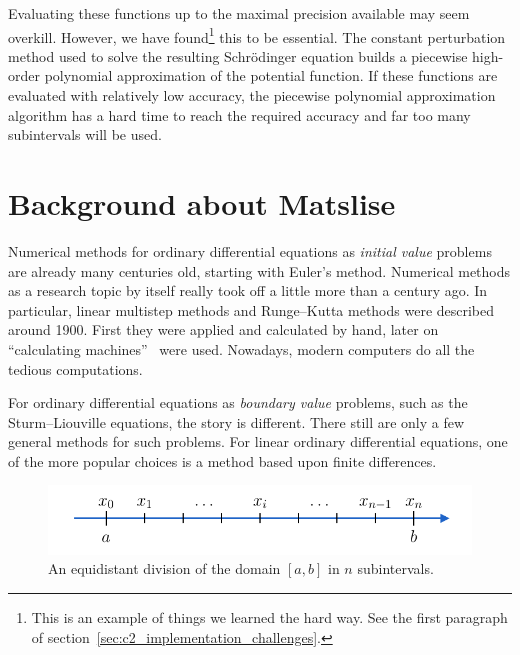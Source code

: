 Evaluating these functions up to the maximal precision available may seem overkill. However, we have found\footnote{This is an example of things we learned the hard way. See the first paragraph of section~\ref{sec:c2_implementation_challenges}.} this to be essential. The constant perturbation method used to solve the resulting Schrödinger equation builds a piecewise high-order polynomial approximation of the potential function. If these functions are evaluated with relatively low accuracy, the piecewise polynomial approximation algorithm has a hard time to reach the required accuracy and far too many subintervals will be used.


\section{Background about Matslise}\label{sec:c2_background}

Numerical methods for ordinary differential equations as \emph{initial value} problems are already many centuries old, starting with Euler's method. Numerical methods as a research topic by itself really took off a little more than a century ago. In particular, linear multistep methods and Runge--Kutta methods were described around 1900. First they were applied and calculated by hand, later on ``calculating machines''~\cite{milne_numerical_1926} were used. Nowadays, modern computers do all the tedious computations.

For ordinary differential equations as \emph{boundary value} problems, such as the Sturm--Liouville equations, the story is different. There still are only a few general methods for such problems. For linear ordinary differential equations, one of the more popular choices is a method based upon finite differences.

\begin{figure}
    \begin{center}
        \includegraphics[width=\textwidth]{img/chapter2/finite_difference_grid.pdf}
    \end{center}
    \caption{An equidistant division of the domain $[a, b]$ in $n$ subintervals.}
    \label{fig:c2_finite_difference_grid}
\end{figure}

